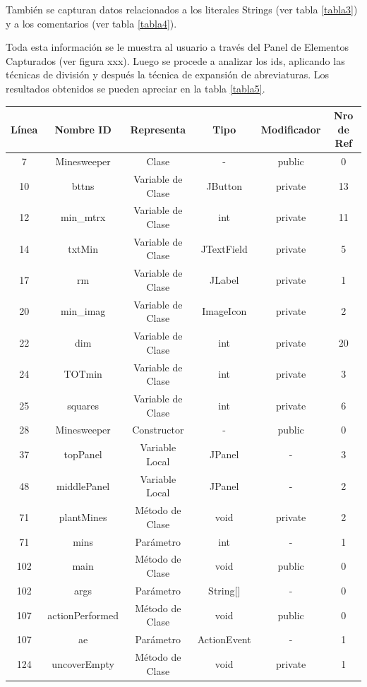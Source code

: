 \documentclass[a4paper,12pt]{report}
\begin{document}
También se capturan datos relacionados a los literales Strings (ver tabla \ref{tabla3}) y a los comentarios (ver tabla \ref{tabla4}).

Toda esta información se le muestra al usuario a través del Panel de Elementos Capturados (ver figura xxx). Luego se procede a analizar los ids, aplicando las técnicas de división y después la técnica de expansión de abreviaturas. Los resultados obtenidos se pueden apreciar en la tabla \ref{tabla5}.



\begin{table}[h]
\centering
	\begin{tabular}{| c | c | c | c | c | c | }      
       \hline
  	   \textsf{Línea} & \textsf{Nombre ID} & \textsf{Representa} & \textsf{Tipo} & \textsf{Modificador} & \textsf{Nro de Ref}\\ \hline
7&Minesweeper&Clase&-&public&0 \\ \hline  	   
10&bttns&Variable de Clase&JButton&private&13 \\ \hline
12&min\_mtrx&Variable de Clase&int&private&11 \\ \hline
14&txtMin&Variable de Clase&JTextField&private&5 \\ \hline
17&rm&Variable de Clase&JLabel&private&1 \\ \hline
20&min\_imag&Variable de Clase&ImageIcon&private&2 \\ \hline
22&dim&Variable de Clase&int&private&20 \\ \hline
24&TOTmin&Variable de Clase&int&private&3 \\ \hline
25&squares&Variable de Clase&int&private&6 \\ \hline
28&Minesweeper&Constructor&-&public&0 \\ \hline
37&topPanel&Variable Local&JPanel&-&3 \\ \hline
48&middlePanel&Variable Local&JPanel&-&2 \\ \hline
71&plantMines&Método de Clase&void&private&2 \\ \hline
71&mins&Parámetro&int&-&1 \\ \hline
102&main&Método de Clase&void&public&0 \\ \hline
102&args&Parámetro&String[]&-&0 \\ \hline
107&actionPerformed&Método de Clase&void&public&0 \\ \hline
107&ae&Parámetro&ActionEvent&-&1 \\ \hline
124&uncoverEmpty&Método de Clase&void&private&1 \\ \hline

\end{tabular}
\end{table}
\end{document}
